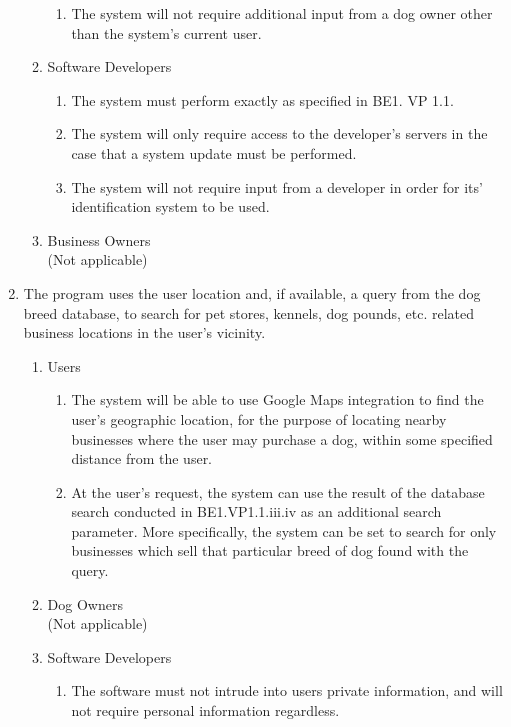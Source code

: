 \documentclass[]{article}
\begin{document}
\begin{enumerate}[{BE}1.]
\begin{enumerate}[{VP1}.1]
			\begin{enumerate}
				\item The system will not require additional input from a dog owner other than the system’s current user.
			\end{enumerate}
     	\item Software Developers
        	\begin{enumerate}
        	\item The system must perform exactly as specified in BE1. VP 1.1.
			\item The system will only require access to the developer’s servers in the case that a system update must be performed.
			\item The system will not require input from a developer in order for its’ identification system to be used.
            \end{enumerate}
      	\item Business Owners\\(Not applicable)
	\end{enumerate}
\item The program uses the user location and, if available, a query from 			the dog breed database, to search for pet stores, kennels, dog 				pounds, etc. related business locations in the user’s vicinity.
	\begin{enumerate}[{VP2}.1]
		\item Users
			\begin{enumerate}
				\item The system will be able to use Google Maps integration to find the user’s geographic location, for the purpose of locating nearby businesses where the user may purchase a dog, within some specified distance from the user.
				\item At the user’s request, the system can use the result of the database search conducted in BE1.VP1.1.iii.iv as an additional search parameter. More specifically, the system can be set to search for only businesses which sell that particular breed of dog found with the query.
			\end{enumerate}
		\item Dog Owners\\(Not applicable)
		\item Software Developers
        	\begin{enumerate}
            \item The software must not intrude into users private information, and will not require personal information regardless.

\end{enumerate}
\end{enumerate}
\end{enumerate}
\end{document}
